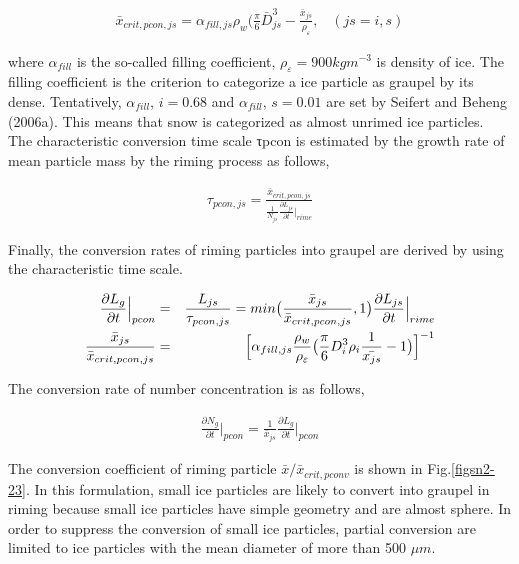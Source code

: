 \begin{eqnarray}
\bar{x}_{crit,pcon,js}=\alpha_{fill,js}\rho_{w}\bigl(\frac{\pi}{6}\bar{D}_{js}^{3}-\frac{\bar{x}_{js}}{\rho_{\varepsilon}},\;\;\;(js=i,s)\label{sn207}
\end{eqnarray}

where $\alpha_{fill}$ is the so-called filling coefficient, $\rho_{\varepsilon} = 900 kg m^{-3}$ is density of ice. The filling coefficient is the criterion to categorize a ice particle as graupel by its dense. Tentatively, $\alpha_{fill}$, $i = 0.68$ and $\alpha_{fill}$, $s = 0.01$ are set by Seifert and Beheng (2006a). This means that snow is categorized as almost unrimed ice particles. The characteristic conversion time scale τpcon is estimated by the growth rate of mean particle mass by the riming process as follows,

\begin{eqnarray}
\tau_{pcon,js}=\frac{\bar{x}_{crit,pcon,js}}{\frac{1}{N_{js}}\frac{\partial L_{js}}{\partial t}\Bigr|_{rime}}\label{sn208}
\end{eqnarray}

Finally, the conversion rates of riming particles into graupel are derived by using the characteristic time scale.

\begin{eqnarray}
\frac{\partial L_{g}}{\partial t}\Bigr|_{pcon}&=&\frac{L_{js}}{\tau_{pcon,js}}=min\bigl(\frac{\bar{x}_{js}}{\bar{x}_{crit,pcon,js}},1\bigr)\frac{\partial L_{js}}{\partial t}\Bigr|_{rime}\label{sn209}\\
\frac{\bar{x}_{js}}{\bar{x}_{crit,pcon,js}}&=&\Bigl[\alpha_{fill,js}\frac{\rho_{w}}{\rho_{\varepsilon}}\bigl(\frac{\pi}{6}D_{i}^{3}\rho_{i}\frac{1}{\bar{x_{js}}}-1\bigr)\Bigr]^{-1}\label{sn210}
\end{eqnarray}

The conversion rate of number concentration is as follows,

\begin{eqnarray}
\frac{\partial N_{g}}{\partial t}\Bigr|_{pcon}=\frac{1}{\bar{x}_{js}}\frac{\partial L_{g}}{\partial t}\Bigr|_{pcon}
\end{eqnarray}

The conversion coefficient of riming particle $\bar{x}/\bar{x}_{crit,pconv}$ is shown in Fig.\ref{figsn2-23}. In this formulation, small ice particles are likely to convert into graupel in riming because small ice particles have simple geometry and are almost sphere. In order to suppress the conversion of small ice particles, partial conversion are limited to ice particles with the mean diameter of more than 500 $\mu m$.

